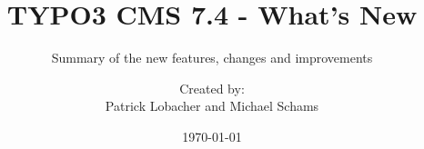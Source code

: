 %

%
%

\documentclass[t]{beamer}

\beamertemplatenavigationsymbolsempty

{
	\usetheme{typo3slides}
}

\title{TYPO3 CMS 7.4 - What's New}
\subtitle{Summary of the new features, changes and improvements}
\author{
	\centerline{Created by:}
	\centerline{Patrick Lobacher and Michael Schams}
}

\date{\today}



\sharefont


\begingroup
	[default]
	\begin{frame}
		\titlepage
	\end{frame}
\endgroup


\section*{TYPO3 CMS 7.4 - What's New}
\begin{frame}[fragile]
	\frametitle{Chapter Overview}
	\framesubtitle{Chapter Overview}

	\tableofcontents

\end{frame}

